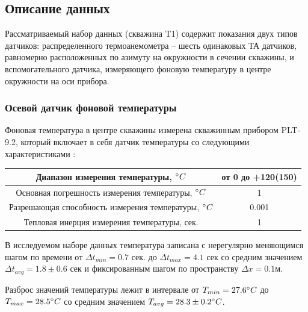 \subsection{Описание данных}
\par
Рассматриваемый набор данных (скважина T1) содержит показания двух типов датчиков: распределенного термоанемометра – шесть одинаковых ТА датчиков, равномерно расположенных по азимуту на окружности в сечении скважины, и вспомогательного датчика, измеряющего фоновую температуру в центре окружности на оси прибора.

\subsubsection{Осевой датчик фоновой температуры}
\par
Фоновая температура в центре скважины измерена скважинным прибором PLT-9.2, который включает в себя датчик температуры со следующими характеристиками \cite{92}:

\begin{center}
\begin{tabular}{ |c|c| } 
 \hline
 Диапазон измерения температуры, $\degree C$ & от 0 до +120(150) \\ 
 \hline
 Основная погрешность измерения температуры, $\degree C$ & 1 \\ 
 \hline
 Разрешающая способность измерения температуры, $\degree C$ & 0.001 \\ 
 \hline
 Тепловая инерция измерения температуры, сек. & 1 \\
 \hline
\end{tabular}
\end{center}

\par
В исследуемом наборе данных температура записана с нерегулярно меняющимся шагом по времени от $\Delta t_{min}=0.7$ сек. до $\Delta t_{max}=4.1$ сек со средним значением $\Delta t_{avg}=1.8\pm0.6$ сек и фиксированным шагом по пространству $\Delta x=0.1$м.
\par
Разброс значений температуры лежит в интервале от $T_{min}=27.6\degree C$ до $T_{max}=28.5\degree C$ со средним значением $T_{avg}=28.3\pm0.2\degree C$.

